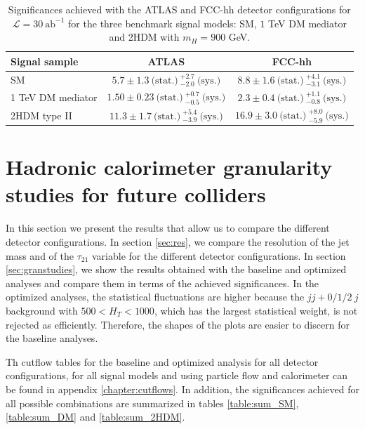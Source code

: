 \begin{table}
	\centering
	\caption{Significances achieved with the ATLAS and FCC-hh detector configurations for $\mathcal{L}=30~\text{ab}^{-1}$ for the three benchmark signal models: SM, $1$ TeV DM mediator and 2HDM with $m_H=900$ GeV.}
	\label{table:FCC_ATLAS_comp}
	\begin{tabular}{lcc}
		\toprule 
		\textbf{Signal sample} & ATLAS  & FCC-hh  \\
		\midrule
		SM & $5.7\pm 1.3 ~\text{(stat.)}~^{+2.7}_{-2.0}~\text{(sys.)}$ & $8.8\pm 1.6~\text{(stat.)}~^{+4.1}_{-3.1}~\text{(sys.)}$ \\
		\rowcolor{black!7}1 TeV DM mediator & $1.50\pm0.23 ~\text{(stat.)}~^{+0.7}_{-0.5}~\text{(sys.)}$ & $2.3\pm0.4 ~\text{(stat.)}~^{+1.1}_{-0.8}~\text{(sys.)}$ \\
		2HDM type II & $11.3\pm 1.7 ~\text{(stat.)}~^{+5.4}_{-3.9}~\text{(sys.)}$ &  $16.9\pm3.0~\text{(stat.)}~^{+8.0}_{-5.9}~\text{(sys.)}$\\ 
		\bottomrule

	\end{tabular}
	
\end{table}


\section{Hadronic calorimeter granularity studies for future colliders}
\label{sec:gran_studies}

In this section we present the results that allow us to compare the different detector configurations. In section \ref{sec:res}, we compare the resolution of the jet mass and of the $\tau_{21}$ variable for the different detector configurations. In section \ref{sec:granstudies}, we show the results obtained with the baseline and optimized analyses and compare them in terms of the achieved significances. In the optimized analyses, the statistical fluctuations are higher because the $jj+0/1/2~j$ background with $500<H_T<1000$, which has the largest statistical weight, is not rejected as efficiently. Therefore, the shapes of the plots are easier to discern for the baseline analyses. 

Th cutflow tables for the baseline and optimized analysis for all detector configurations, for all signal models and using particle flow and calorimeter can be found in appendix \ref{chapter:cutflows}. In addition, the significances achieved for all possible combinations are summarized in tables \ref{table:sum_SM}, \ref{table:sum_DM} and \ref{table:sum_2HDM}.


